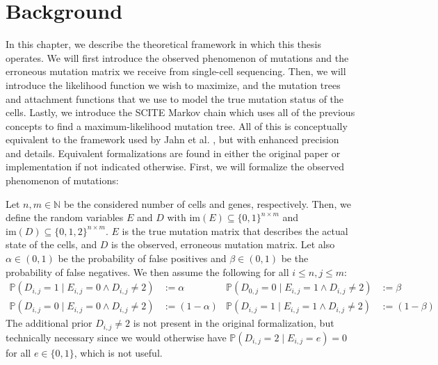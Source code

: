 \chapter{Background}
\label{ch:background}

In this chapter, we describe the theoretical framework in which this thesis operates. We will first introduce the observed phenomenon of mutations and the erroneous mutation matrix we receive from single-cell sequencing. Then, we will introduce the likelihood function we wish to maximize, and the mutation trees and attachment functions that we use to model the true mutation status of the cells. Lastly, we introduce the \ac{SCITE} Markov chain which uses all of the previous concepts to find a maximum-likelihood mutation tree. All of this is conceptually equivalent to the framework used by Jahn et al. \cite{tree2016}, but with enhanced precision and details. Equivalent formalizations are found in either the original paper or implementation if not indicated otherwise. First, we will formalize the observed phenomenon of mutations:

\begin{definition}
    \label{def:mutmatrix}
    Let $n, m \in \mathbb{N}$ be the considered number of cells and genes, respectively. Then, we define the random variables $E$ and $D$ with $\mathrm{im}(E) \subseteq \{0,1\}^{n \times m}$ and $\mathrm{im}(D) \subseteq \{0, 1, 2\}^{n \times m}$. $E$ is the true mutation matrix that describes the actual state of the cells, and $D$ is the observed, erroneous mutation matrix. Let also $\alpha \in (0,1)$ be the probability of false positives and $\beta \in (0,1)$ be the probability of false negatives. We then assume the following for all $i \leq n, j \leq m$:
    \begin{align*}
        \mathbb{P}(D_{i,j} = 1 \mid E_{i,j} = 0 \wedge D_{i,j} \neq 2) &:= \alpha & \mathbb{P}(D_{0,j} = 0\mid E_{i,j} = 1 \wedge D_{i,j} \neq 2) &:= \beta \\
        \mathbb{P}(D_{i,j} = 0 \mid E_{i,j} = 0 \wedge D_{i,j} \neq 2) &:= (1-\alpha) & \mathbb{P}(D_{i,j} = 1 \mid E_{i,j} = 1 \wedge D_{i,j} \neq 2) &:= (1-\beta)
    \end{align*}
    The additional prior $D_{i,j} \neq 2$ is not present in the original formalization, but technically necessary since we would otherwise have $\mathbb{P}(D_{i,j} = 2 \mid E_{i,j} = e) = 0$ for all $e \in \{0,1\}$, which is not useful.
\end{definition}

